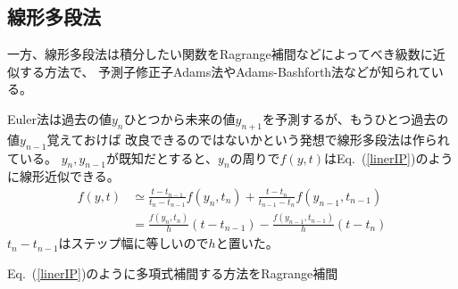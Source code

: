 \documentclass[autodetect-engine,dvipdfmx-if-dvi,ja=standard,a4paper,layout=v2]{bxjsreport}
\newcommand{\eref}[1]{Eq.~(\ref{#1})}
\begin{document}
    \subsection{線形多段法}
    一方、線形多段法は積分したい関数をRagrange補間などによってべき級数に近似する方法で、
    予測子修正子Adams法やAdams-Bashforth法などが知られている。\par
    Euler法は過去の値$y_n$ひとつから未来の値$y_{n+1}$を予測するが、もうひとつ過去の値$y_{n-1}$覚えておけば
    改良できるのではないかという発想で線形多段法は作られている。
    $y_n,y_{n-1}$が既知だとすると、$y_n$の周りで$f(y,t)$は\eref{linerIP}のように線形近似できる。
    \begin{align}
      f(y, t)
      &\simeq \frac{t-t_{n-1}}{t_n-t_{n-1}}f(y_n, t_n)+ \frac{t-t_{n}}{t_{n-1}-t_n}f(y_{n-1},t_{n-1}) \nonumber\\
      &=\frac{f(y_n,t_n)}{h}(t-t_{n-1}) - \frac{f(y_{n-1}, t_{n-1})}{h}(t-t_{n})\label{linerIP}
    \end{align}
    $t_n-t_{n-1}$はステップ幅に等しいので$h$と置いた。\par
    \eref{linerIP}のように多項式補間する方法をRagrange補間
\end{document}
